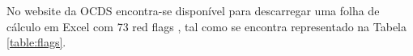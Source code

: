 %
%
%
%
%
%

No website da OCDS encontra-se disponível para descarregar uma folha de cálculo em Excel com 73 red flags \cite{spreadsheet1} \cite{spreadsheet}, tal como se encontra representado na Tabela \ref{table:flags}.

